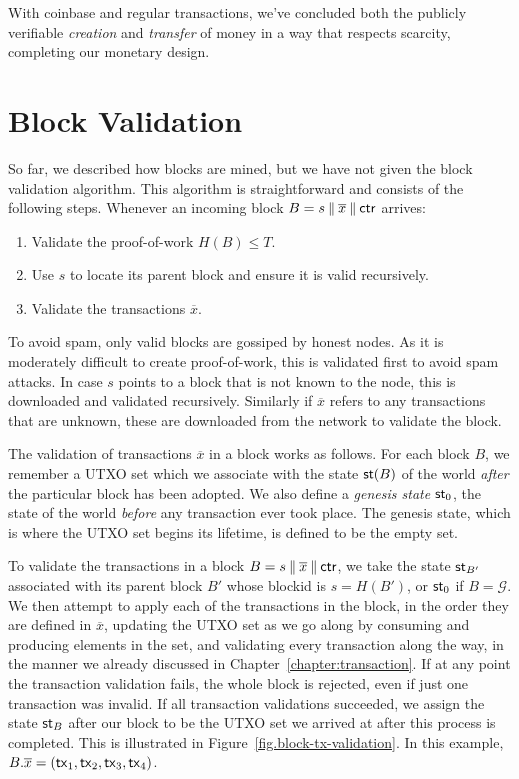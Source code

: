 With coinbase and regular transactions, we've concluded both the publicly verifiable \emph{creation}
and \emph{transfer} of money in a way that respects scarcity, completing our monetary design.

\section{Block Validation}

So far, we described how blocks are mined, but we have not given the block validation algorithm.
This algorithm is straightforward and consists of the following steps. Whenever an incoming
block $B = s \mathbin{\|} \overline{x} \mathbin{\|} \mathsf{ctr}$ arrives:

\begin{enumerate}
    \item Validate the proof-of-work $H(B) \leq T$.
    \item Use $s$ to locate its parent block and ensure it is valid recursively.
    \item Validate the transactions $\overline{x}$.
\end{enumerate}

To avoid spam, only valid blocks are gossiped by honest nodes. As it is moderately difficult to
create proof-of-work, this is validated first to avoid spam attacks. In case $s$ points to a block
that is not known to the node, this is downloaded and validated recursively. Similarly if
$\overline{x}$ refers to any transactions that are unknown, these are downloaded from the network
to validate the block.

The validation of transactions
$\overline{x}$ in a block works as follows. For each block $B$, we remember a UTXO set which we
associate with the state $\mathsf{st}(B)$ of the world \emph{after} the particular block has been adopted.
We also define a \emph{genesis state} $\mathsf{st}_0$, the state of the world \emph{before}
any transaction ever
took place. The genesis state, which is where the UTXO set begins its lifetime, is defined to be the
empty set.

To validate the transactions in a block $B = s \mathbin{\|} \overline{x} \mathbin{\|} \mathsf{ctr}$, we take the state
$\mathsf{st}_{B'}$ associated with
its parent block $B'$ whose blockid is $s = H(B')$, or $\mathsf{st}_0$ if $B = \mathcal{G}$.
We then attempt to apply each of the transactions in the block, in the order
they are defined in $\overline{x}$, updating the UTXO set as we go along by consuming
and producing elements in the set, and validating
every transaction along the way, in the manner we already discussed in Chapter~\ref{chapter:transaction}.
If at any point the transaction validation fails, the whole block is rejected,
even if just one transaction was invalid. If all transaction validations succeeded,
we assign the state $\mathsf{st}_B$ after our block to be the UTXO set we arrived at after
this process is completed. This is illustrated in Figure~\ref{fig.block-tx-validation}.
In this example, $B.\overline{x} = (\mathsf{tx}_1, \mathsf{tx}_2, \mathsf{tx}_3, \mathsf{tx}_4)$.

